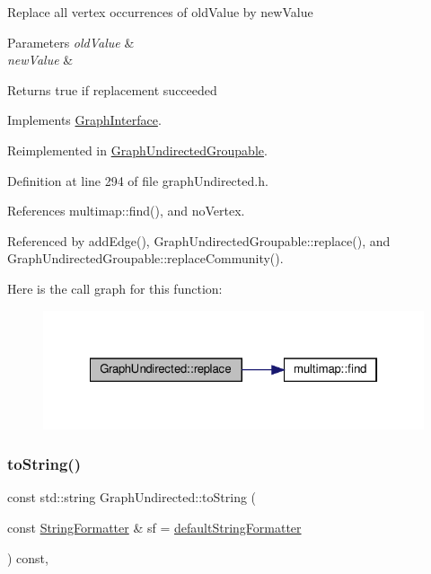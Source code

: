 Replace all vertex occurrences of old\+Value by new\+Value


\begin{DoxyParams}{Parameters}
{\em old\+Value} & \\
\hline
{\em new\+Value} & \\
\hline
\end{DoxyParams}
\begin{DoxyReturn}{Returns}
true if replacement succeeded 
\end{DoxyReturn}


Implements \hyperlink{classGraphInterface_a448a3c66fb5650339f84366257d322ee}{Graph\+Interface}.



Reimplemented in \hyperlink{classGraphUndirectedGroupable_a164600ca9727676ad7b370b9061927d4}{Graph\+Undirected\+Groupable}.



Definition at line 294 of file graph\+Undirected.\+h.



References multimap\+::find(), and no\+Vertex.



Referenced by add\+Edge(), Graph\+Undirected\+Groupable\+::replace(), and Graph\+Undirected\+Groupable\+::replace\+Community().

Here is the call graph for this function\+:
\nopagebreak
\begin{figure}[H]
\begin{center}
\leavevmode
\includegraphics[width=322pt]{classGraphUndirected_aee3bc279ffe39f8efb7dd60865279474_cgraph}
\end{center}
\end{figure}
\mbox{\label{classGraphUndirected_a61604a0840f044d52a2762f44635fa9c}} 
\subsubsection{\texorpdfstring{to\+String()}{toString()}}
{\footnotesize\ttfamily const std\+::string Graph\+Undirected\+::to\+String (\begin{DoxyParamCaption}\item[{const \hyperlink{classStringFormatter}{String\+Formatter} \&}]{sf = {\ttfamily \hyperlink{stringFormatter_8h_abf1349c8e24162d0134072aff288f2a2}{default\+String\+Formatter}} }\end{DoxyParamCaption}) const\hspace{0.3cm}{\ttfamily [inline]}, {\ttfamily [virtual]}}

